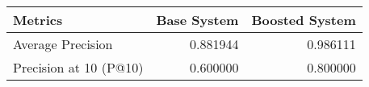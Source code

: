 \begin{tabular}{lrr}
\toprule
Metrics & Base System & Boosted System \\
\midrule
Average Precision & 0.881944 & 0.986111 \\
Precision at 10 (P@10) & 0.600000 & 0.800000 \\
\bottomrule
\end{tabular}
